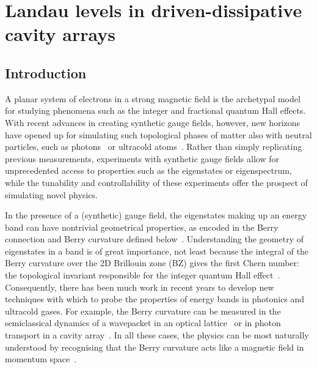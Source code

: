 

\chapter{Landau levels in driven-dissipative cavity arrays}
\label{cha:landau}

\section{Introduction}

A planar system of electrons in a strong magnetic field is the
archetypal model for studying phenomena such as the integer and
fractional quantum Hall effects. With recent advances in creating
synthetic gauge fields, however, new horizons have opened up for
simulating such topological phases of matter also with neutral
particles, such as photons~\cite{hafezi2014synthetic} or ultracold
atoms~\cite{dalibardrmp2011, goldman_repprog_2014,
Goldman_arxiv_2015}.  Rather than simply replicating previous
measurements, experiments with synthetic gauge fields allow for
unprecedented access to properties such as the eigenstates or
eigenspectrum, while the tunability and controllability of these
experiments offer the prospect of simulating novel physics.

In the presence of a (synthetic) gauge field, the eigenstates making
up an energy band can have nontrivial geometrical properties, as
encoded in the Berry connection and Berry curvature defined
below~\cite{berry, xiao2010berryreview}. Understanding the geometry of
eigenstates in a band is of great importance, not least because the
integral of the Berry curvature over the 2D Brillouin zone (BZ) gives
the first Chern number: the topological invariant responsible for the
integer quantum Hall effect~\cite{thouless}. Consequently, there has
been much work in recent years to develop new techniques with which to
probe the properties of energy bands in photonics and ultracold
gases. For example, the Berry curvature can be measured in the
semiclassical dynamics of a wavepacket in an optical
lattice~\cite{dudarev,1chang, price, cominotti, dauphin,
aidelsburger2015measuring, jotzu2014experimental} or in photon
transport in a cavity array~\cite{ozawa2014qhe}. In all these cases,
the physics can be most naturally understood by recognising that the
Berry curvature acts like a magnetic field in momentum
space~\cite{berry, bliokh2005spin, PhysRevD.12.3845,
cooper2012designing}.

